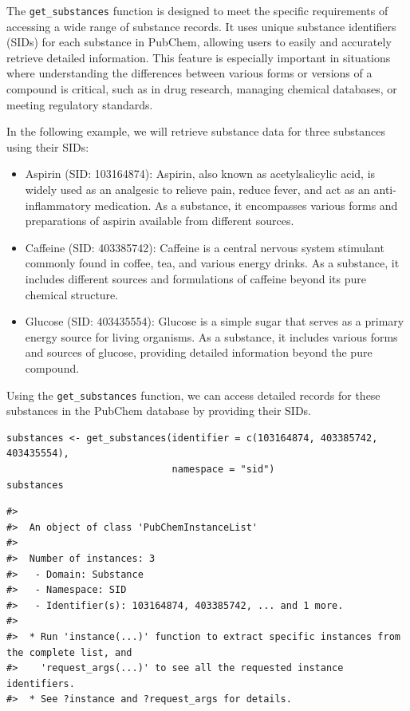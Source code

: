 The \texttt{get\_substances} function is designed to meet the specific requirements of accessing a wide range of substance records. It uses unique substance identifiers (SIDs) for each substance in PubChem, allowing users to easily and accurately retrieve detailed information. This feature is especially important in situations where understanding the differences between various forms or versions of a compound is critical, such as in drug research, managing chemical databases, or meeting regulatory standards.

In the following example, we will retrieve substance data for three substances using their SIDs:

\begin{itemize}
\item
  Aspirin (SID: 103164874): Aspirin, also known as acetylsalicylic acid, is widely used as an analgesic to relieve pain, reduce fever, and act as an anti-inflammatory medication. As a substance, it encompasses various forms and preparations of aspirin available from different sources.
\item
  Caffeine (SID: 403385742): Caffeine is a central nervous system stimulant commonly found in coffee, tea, and various energy drinks. As a substance, it includes different sources and formulations of caffeine beyond its pure chemical structure.
\item
  Glucose (SID: 403435554): Glucose is a simple sugar that serves as a primary energy source for living organisms. As a substance, it includes various forms and sources of glucose, providing detailed information beyond the pure compound.
\end{itemize}

Using the \texttt{get\_substances} function, we can access detailed records for these substances in the PubChem database by providing their SIDs.

\begin{verbatim}
substances <- get_substances(identifier = c(103164874, 403385742, 403435554), 
                             namespace = "sid") 
substances
\end{verbatim}

\begin{verbatim}
#> 
#>  An object of class 'PubChemInstanceList'
#> 
#>  Number of instances: 3
#>   - Domain: Substance
#>   - Namespace: SID
#>   - Identifier(s): 103164874, 403385742, ... and 1 more.
#> 
#>  * Run 'instance(...)' function to extract specific instances from the complete list, and
#>    'request_args(...)' to see all the requested instance identifiers.
#>  * See ?instance and ?request_args for details.
\end{verbatim}

